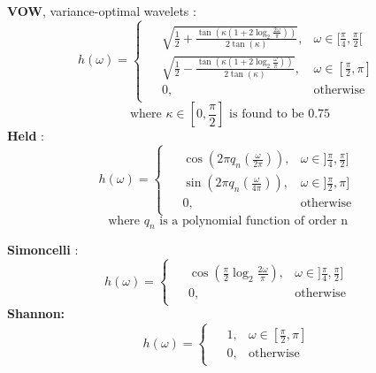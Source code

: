 \noindent\textbf{VOW}, variance-optimal wavelets \cite{pad_vow:_2014} :
\begin{equation*}
\label{VOW}
  h(\omega) =
    \begin{cases}
    \begin{aligned}
      &\sqrt{\frac{1}{2} + \frac{\tan(\kappa(1+2\log_2\frac{2\omega}{\pi}))}{2\tan(\kappa)}} , &\omega \in [\frac{\pi}{4} , \frac{\pi}{2} [ \\
      &\sqrt{\frac{1}{2} - \frac{\tan(\kappa(1+2\log_2\frac{\omega}{\pi}))}{2\tan(\kappa)}} , &\omega \in [\frac{\pi}{2} , \pi ] \\
      &0, &\text{otherwise}
    \end{aligned}
    \end{cases}
\end{equation*}
\begin{equation*}
  \text{where } \kappa \in [0, \frac{\pi}{2}] \text{ is found to be } 0.75
\end{equation*}
\newline
\noindent\textbf{Held} \cite{held_steerable_2010} :
\begin{equation*}
\label{Held}
  h(\omega) =
    \begin{cases}
    \begin{aligned}
&\cos\left(2\pi q_n(\frac{\omega}{2\pi})\right) , &\omega \in ]\frac{\pi}{4} , \frac{\pi}{2} ] \\
  &\sin\left(2\pi q_n(\frac{\omega}{4\pi})\right) , &\omega \in ]\frac{\pi}{2} , \pi ] \\
      &0, &\text{otherwise}
    \end{aligned}
    \end{cases}
\end{equation*}
\begin{equation*}
  \text{where } q_n \text{ is a polynomial function of order n }
\end{equation*}

\noindent\textbf{Simoncelli} \cite{portilla_image_2000, simoncelli_steerable_1995} :
\begin{equation*}
\label{Simoncelli}
  h(\omega) =
    \begin{cases}
    \begin{aligned}
  &\cos\left(\frac{\pi}{2} \log_2\frac{2\omega}{\pi}\right) , &\omega \in ]\frac{\pi}{4} , \frac{\pi}{2} ] \\
  &0, &\text{otherwise}
    \end{aligned}
    \end{cases}
\end{equation*}
\noindent\textbf{Shannon:}
\begin{equation*}
\label{Shannon}
  h(\omega) =
    \begin{cases}
    \begin{aligned}
  &1, &\omega \in [\frac{\pi}{2} , \pi ] \\
  &0, &\text{otherwise}
    \end{aligned}
    \end{cases}
\end{equation*}

